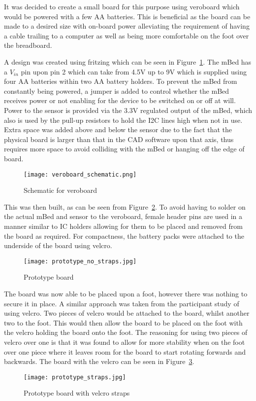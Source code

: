 It was decided to create a small board for this purpose using veroboard which would be powered with a few AA batteries. This is beneficial as the board can be made to a desired size with on-board power alleviating the requirement of having a cable trailing to a computer as well as being more comfortable on the foot over the breadboard.

A design was created using fritzing \cite{fritzing} which can be seen in Figure~\ref{fig:veroboard_schematic}. The mBed has a $V_{in}$ pin upon pin 2 which can take from 4.5V up to 9V which is supplied using four AA batteries within two AA battery holders. To prevent the mBed from constantly being powered, a jumper is added to control whether the mBed receives power or not enabling for the device to be switched on or off at will. Power to the sensor is provided via the 3.3V regulated output of the mBed, which also is used by the pull-up resistors to hold the I2C lines high when not in use. Extra space was added above and below the sensor due to the fact that the physical board is larger than that in the CAD software upon that axis, thus requires more space to avoid colliding with the mBed or hanging off the edge of board.

\begin{figure}
	\centering
	\texttt{[image: veroboard\_schematic.png]}
	\caption{Schematic for veroboard}
	\label{fig:veroboard_schematic}
\end{figure}

This was then built, as can be seen from Figure~\ref{fig:board}. To avoid having to solder on the actual mBed and sensor to the veroboard, female header pins are used in a manner similar to IC holders allowing for them to be placed and removed from the board as required. For compactness, the battery packs were attached to the underside of the board using velcro. 

\begin{figure}
	\centering
	\texttt{[image: prototype\_no\_straps.jpg]}
	\caption{Prototype board}
	\label{fig:board}
\end{figure}

The board was now able to be placed upon a foot, however there was nothing to secure it in place. A similar approach was taken from the participant study of using velcro. Two pieces of velcro would be attached to the board, whilst another two to the foot. This would then allow the board to be placed on the foot with the velcro holding the board onto the foot. The reasoning for using two pieces of velcro over one is that it was found to allow for more stability when on the foot over one piece where it leaves room for the board to start rotating forwards and backwards. The board with the velcro can be seen in Figure~\ref{fig:board:velcro}.

\begin{figure}
	\centering
	\texttt{[image: prototype\_straps.jpg]}
	\caption{Prototype board with velcro straps}
	\label{fig:board:velcro}
\end{figure}

